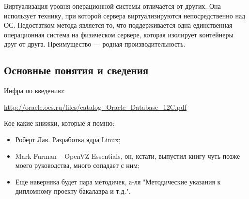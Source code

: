 Виртуализация уровня операционной системы отличается от других.
Она использует технику, при которой сервера виртуализируются непосредственно над ОС.
Недостатком метода является то, что поддерживается одна единственная операционная система на физическом сервере, которая изолирует контейнеры друг от друга.
Преимущество --- родная производительность.



\subsection{Основные понятия и сведения}

Инфра по введению:

\url{http://oracle.ocs.ru/files/catalog_Oracle_Database_12C.pdf}


Кое-какие книжки, которые я помню:
\begin{itemize}
    \item Роберт Лав. Разработка ядра Linux;
    \item Mark Furman -- OpenVZ Essentials, он, кстати, выпустил книгу чуть позже моего руководства, много сопадает с ним;
    \item Еще наверняка будет пара методичек, а-ля "Методические указания к дипломному проекту бакалавра и т.д.".
\end{itemize}

